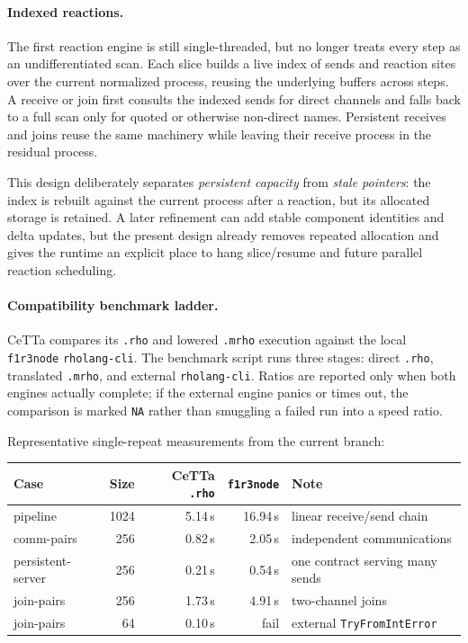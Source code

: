 \documentclass[11pt]{article}
\newcommand{\code}[1]{\texttt{#1}}
\newcommand{\CeTTa}{\textup{CeTTa}}
\begin{document}
\paragraph{Indexed reactions.}
The first reaction engine is still single-threaded, but no longer treats every
step as an undifferentiated scan.  Each slice builds a live index of sends and
reaction sites over the current normalized process, reusing the underlying
buffers across steps.  A receive or join first consults the indexed sends for
direct channels and falls back to a full scan only for quoted or otherwise
non-direct names.  Persistent receives and joins reuse the same machinery while
leaving their receive process in the residual process.

This design deliberately separates \emph{persistent capacity} from
\emph{stale pointers}: the index is rebuilt against the current process after a
reaction, but its allocated storage is retained.  A later refinement can add
stable component identities and delta updates, but the present design already
removes repeated allocation and gives the runtime an explicit place to hang
slice/resume and future parallel reaction scheduling.

\paragraph{Compatibility benchmark ladder.}
\CeTTa{} compares its \code{.rho} and lowered \code{.mrho} execution against
the local \code{f1r3node} \code{rholang-cli}.  The benchmark script runs three
stages: direct \code{.rho}, translated \code{.mrho}, and external
\code{rholang-cli}.  Ratios are reported only when both engines actually
complete; if the external engine panics or times out, the comparison is marked
\code{NA} rather than smuggling a failed run into a speed ratio.

Representative single-repeat measurements from the current branch:
\begin{center}
\begin{tabular}{lrrrl}
\toprule
Case & Size & \CeTTa{} \code{.rho} & \code{f1r3node} & Note \\
\midrule
pipeline & 1024 & 5.14\,s & 16.94\,s & linear receive/send chain \\
comm-pairs & 256 & 0.82\,s & 2.05\,s & independent communications \\
persistent-server & 256 & 0.21\,s & 0.54\,s & one contract serving many sends \\
join-pairs & 256 & 1.73\,s & 4.91\,s & two-channel joins \\
join-pairs & 64 & 0.10\,s & fail & external \code{TryFromIntError} \\
\bottomrule
\end{tabular}
\end{center}
\end{document}

